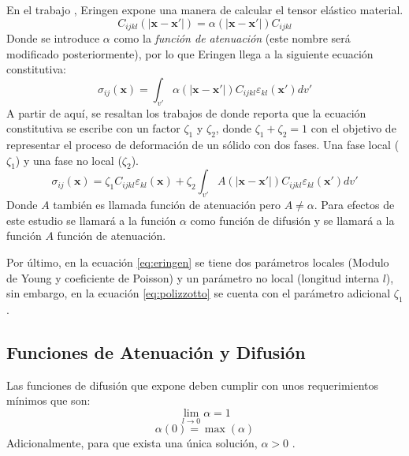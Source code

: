 En el trabajo , Eringen expone una manera de calcular el tensor elástico material.
\begin{equation}
	C_{ijkl}(|\boldsymbol{x}-\boldsymbol{x'}|)=\alpha(|\boldsymbol{x}-\boldsymbol{x'}|)C_{ijkl}
\end{equation}
Donde se introduce $\alpha$ como la \textit{función de atenuación} (este nombre será modificado posteriormente), por lo que Eringen llega a la siguiente ecuación constitutiva:
\begin{equation}
	\sigma_{ij}(\boldsymbol{x})=\int_{v'}\alpha(|\boldsymbol{x}-\boldsymbol{x'}|)C_{ijkl}\varepsilon_{kl}(\boldsymbol{x'})dv'
	\label{eq:eringen}
\end{equation}
A partir de aquí, se resaltan los trabajos de \textcite{Polizzotto2001} donde reporta que la ecuación constitutiva se escribe con un factor $\zeta_1$ y $\zeta_2$, donde $\zeta_1+\zeta_2=1$ con el objetivo de representar el proceso de deformación de un sólido con dos fases. Una fase local ($\zeta_1$) y una fase no local ($\zeta_2$).
\begin{equation}
	\sigma_{ij}(\boldsymbol{x})=\zeta_1C_{ijkl}\varepsilon_{kl}(\boldsymbol{x})+\zeta_2\int_{v'}A(|\boldsymbol{x}-\boldsymbol{x'}|)C_{ijkl}\varepsilon_{kl}(\boldsymbol{x'})dv'
	\label{eq:polizzotto}
\end{equation}
Donde $A$ también es llamada función de atenuación pero $A\neq\alpha$.
Para efectos de este estudio se llamará a la función $\alpha$ como función de difusión y se llamará a la función $A$ función de atenuación.

Por último, en la ecuación \ref{eq:eringen} se tiene dos parámetros locales (Modulo de Young y coeficiente de Poisson) y un parámetro no local (longitud interna $l$), sin embargo, en la ecuación \ref{eq:polizzotto} se cuenta con el parámetro adicional $\zeta_1$.
\subsection{Funciones de Atenuación y Difusión}

Las funciones de difusión que expone \textcite{Eringen1987} deben cumplir con unos requerimientos mínimos que son:
\begin{equation}
	\lim_{l\to0}\alpha=1
\end{equation}
\begin{equation}
	\alpha(0)=\max(\alpha)
\end{equation}
Adicionalmente, para que exista una única solución, $\alpha>0$ \parencite{ALTAN19891271}.

